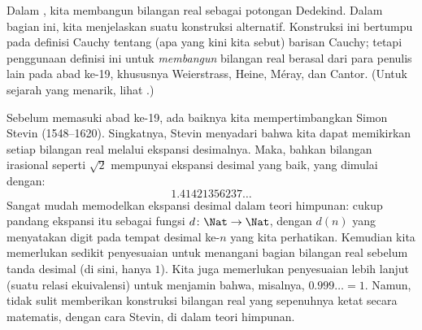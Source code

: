 \documentclass[../../../include/open-logic-section]{subfiles}
\begin{document}


Dalam , kita membangun bilangan real sebagai potongan
Dedekind. Dalam bagian ini, kita menjelaskan suatu konstruksi alternatif.
Konstruksi ini bertumpu pada definisi Cauchy tentang (apa yang kini kita sebut)
barisan Cauchy; tetapi penggunaan definisi ini untuk \emph{membangun} bilangan
real berasal dari para penulis lain pada abad ke-19, khususnya Weierstrass,
Heine, M\'{e}ray, dan Cantor. (Untuk sejarah yang menarik, lihat
\citeauthor{OConnorRobertson:RN} \citeyear{OConnorRobertson:RN}.)

Sebelum memasuki abad ke-19, ada baiknya kita mempertimbangkan Simon Stevin
(1548--1620). Singkatnya, Stevin menyadari bahwa kita dapat memikirkan setiap
bilangan real melalui ekspansi desimalnya. Maka, bahkan bilangan irasional
seperti $\sqrt{2}$ mempunyai ekspansi desimal yang baik, yang dimulai dengan:
\[
	1.41421356237\ldots
\]
Sangat mudah memodelkan ekspansi desimal dalam teori himpunan: cukup pandang
ekspansi itu sebagai fungsi $d \colon \Nat \to \Nat$, dengan $d(n)$ yang
menyatakan digit pada tempat desimal ke-$n$ yang kita perhatikan. Kemudian kita memerlukan sedikit
penyesuaian untuk menangani bagian bilangan real sebelum tanda desimal (di
sini, hanya $1$). Kita juga memerlukan penyesuaian lebih lanjut (suatu relasi
ekuivalensi) untuk menjamin bahwa, misalnya, $0.999\ldots = 1$. Namun, tidak
sulit memberikan konstruksi bilangan real yang sepenuhnya ketat secara
matematis, dengan cara Stevin, di dalam teori himpunan.
\end{document}
